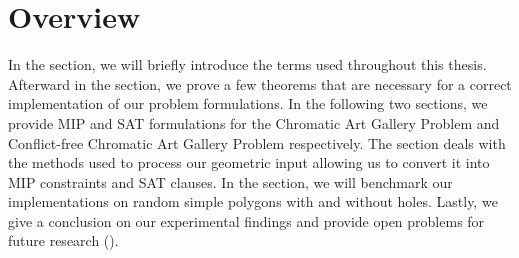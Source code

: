 \section{Overview}
In the  section, we will briefly introduce the terms used throughout this thesis. Afterward in the  section, we prove a few theorems that are necessary for a correct implementation of our problem formulations. In the following two sections, we provide MIP and SAT formulations for the Chromatic Art Gallery Problem and Conflict-free Chromatic Art Gallery Problem respectively. The  section deals with the methods used to process our geometric input allowing us to convert it into MIP constraints and SAT clauses. In the  section, we will benchmark our implementations on random simple polygons with and without holes. Lastly, we give a conclusion on our experimental findings and provide open problems for future research ().